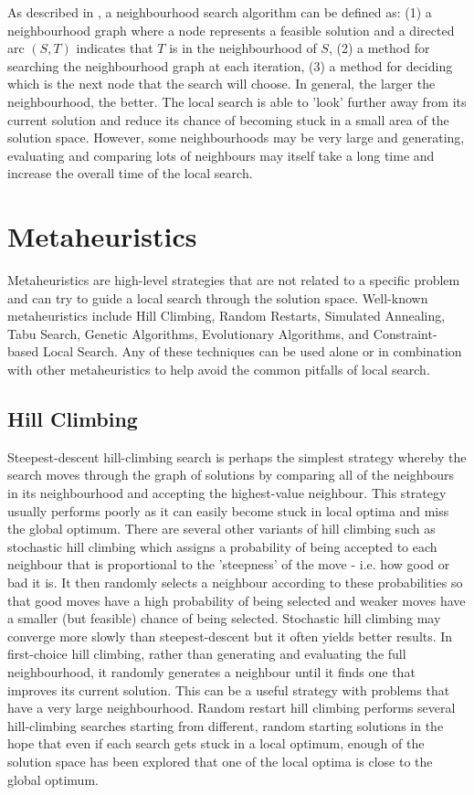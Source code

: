 As described in \citet{ahuja2002survey}, a neighbourhood search algorithm can be defined as: (1) a neighbourhood graph where a node represents a feasible solution and a directed arc $(S,T)$ indicates that $T$ is in the neighbourhood of $S$, (2) a method for searching the neighbourhood graph at each iteration, (3) a method for deciding which is the next node that the search will choose. In general, the larger the neighbourhood, the better. The local search is able to 'look' further away from its current solution and reduce its chance of becoming stuck in a small area of the solution space. However, some neighbourhoods may be very large and generating, evaluating and comparing lots of neighbours may itself take a long time and increase the overall time of the local search.

\section{Metaheuristics}

Metaheuristics are high-level strategies that are not related to a specific problem and can try to guide a local search through the solution space. Well-known metaheuristics include Hill Climbing, Random Restarts, Simulated Annealing, Tabu Search, Genetic Algorithms, Evolutionary Algorithms, and Constraint-based Local Search. Any of these techniques can be used alone or in combination with other metaheuristics to help avoid the common pitfalls of local search.

\subsection{Hill Climbing}

Steepest-descent hill-climbing search is perhaps the simplest strategy whereby the search moves through the graph of solutions by comparing all of the neighbours in its neighbourhood and accepting the highest-value neighbour. This strategy usually performs poorly as it can easily become stuck in local optima and miss the global optimum. There are several other variants of hill climbing such as stochastic hill climbing which assigns a probability of being accepted to each neighbour that is proportional to the 'steepness' of the move - i.e. how good or bad it is. It then randomly selects a neighbour according to these probabilities so that good moves have a high probability of being selected and weaker moves have a smaller (but feasible) chance of being selected. Stochastic hill climbing may converge more slowly than steepest-descent but it often yields better results. In first-choice hill climbing, rather than generating and evaluating the full neighbourhood, it randomly generates a neighbour until it finds one that improves its current solution. This can be a useful strategy with problems that have a very large neighbourhood. Random restart hill climbing performs several hill-climbing searches starting from different, random starting solutions in the hope that even if each search gets stuck in a local optimum, enough of the solution space has been explored that one of the local optima is close to the global optimum.

